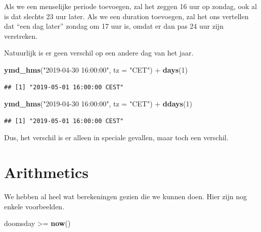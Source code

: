 \documentclass[]{tufte-book}
\newenvironment{Shaded}{}{}
\newcommand{\DataTypeTok}[1]{\textcolor[rgb]{0.56,0.13,0.00}{#1}}
\newcommand{\DecValTok}[1]{\textcolor[rgb]{0.25,0.63,0.44}{#1}}
\newcommand{\KeywordTok}[1]{\textcolor[rgb]{0.00,0.44,0.13}{\textbf{#1}}}
\newcommand{\NormalTok}[1]{#1}
\newcommand{\OperatorTok}[1]{\textcolor[rgb]{0.40,0.40,0.40}{#1}}
\newcommand{\StringTok}[1]{\textcolor[rgb]{0.25,0.44,0.63}{#1}}
\begin{document}
Als we een menselijke periode toevoegen, zal het zeggen 16 uur op zondag, ook al is dat slechts 23 uur later. Als we een duration toevoegen, zal het ons vertellen dat ``een dag later'' zondag om 17 uur is, omdat er dan pas 24 uur zijn verstreken.

Natuurlijk is er geen verschil op een andere dag van het jaar.

\begin{Shaded}
\begin{Highlighting}[]
\KeywordTok{ymd_hms}\NormalTok{(}\StringTok{"2019-04-30 16:00:00"}\NormalTok{, }\DataTypeTok{tz =} \StringTok{"CET"}\NormalTok{) }\OperatorTok{+}\StringTok{ }\KeywordTok{days}\NormalTok{(}\DecValTok{1}\NormalTok{)}
\end{Highlighting}
\end{Shaded}

\begin{verbatim}
## [1] "2019-05-01 16:00:00 CEST"
\end{verbatim}

\begin{Shaded}
\begin{Highlighting}[]
\KeywordTok{ymd_hms}\NormalTok{(}\StringTok{"2019-04-30 16:00:00"}\NormalTok{, }\DataTypeTok{tz =} \StringTok{"CET"}\NormalTok{) }\OperatorTok{+}\StringTok{ }\KeywordTok{ddays}\NormalTok{(}\DecValTok{1}\NormalTok{)}
\end{Highlighting}
\end{Shaded}

\begin{verbatim}
## [1] "2019-05-01 16:00:00 CEST"
\end{verbatim}

Dus, het verschil is er alleen in speciale gevallen, maar toch een verschil.

\hypertarget{arithmetics}{%
\section{Arithmetics}\label{arithmetics}}

We hebben al heel wat berekeningen gezien die we kunnen doen. Hier zijn nog enkele voorbeelden.

\begin{Shaded}
\begin{Highlighting}[]
\NormalTok{doomsday }\OperatorTok{>=}\StringTok{ }\KeywordTok{now}\NormalTok{()}
\end{Highlighting}
\end{Shaded}
\end{document}
